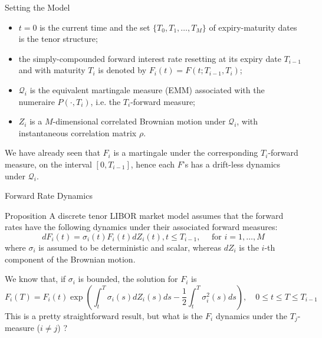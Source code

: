 \documentclass{beamer}
\begin{document}
\begin{frame}{Setting the Model}
  \begin{itemize}
  \item $t = 0$ is the current time and the set $\{T_0, T_1, \dots, T_M\}$ of expiry-maturity dates is the tenor structure; %
  \item the simply-compounded forward interest rate resetting at its expiry date $T_{i-1}$ and with maturity $T_i$ is denoted by $F_i(t) = F(t; T_{i-1}, T_i)$; %
  \item $\mathcal{Q}_i$ is the equivalent martingale measure (EMM) associated with the numeraire $P(\cdot, T_i)$, i.e. the $T_i$-forward measure;
  \item $Z_i$ is a $M$-dimensional correlated Brownian motion under $\mathcal{Q}_i$, with instantaneous correlation matrix $\rho$.
  \end{itemize}
  We have already seen that $F_i$ is a martingale under the corresponding $T_i$-forward measure, on the interval $[0, T_{i-1}]$, hence each $F$’s has a drift-less dynamics under $\mathcal{Q}_i$.
\end{frame}

\begin{frame}{Forward Rate Dynamics}
  \begin{block}{Proposition}
    A discrete tenor LIBOR market model assumes that the forward rates have the following dynamics under their associated forward measures:
    \begin{equation}
      dF_i(t) = \sigma_i(t)F_i(t)dZ_i(t), t \le T_{i-1},\quad\text{ for } i = 1,\ldots, M
      \label{eq:forward_process_lmm}
    \end{equation}
    where $\sigma_i$ is assumed to be deterministic and scalar, whereas $dZ_i$ is the $i$-th component of the Brownian motion.
  \end{block}
  We know that, if $\sigma_i$ is bounded, the solution for $F_i$ is 
  \begin{equation*}
    F_i(T) = F_i(t) \exp\left(\int_t^T\sigma_i(s)dZ_i(s)ds - \frac{1}{2}\int_t^T 
    \sigma_i^2(s)ds\right),\quad 0\le t \le T \le T_{i-1} 
  \end{equation*}
  This is a pretty straightforward result, but what is the $F_i$ dynamics under the $T_j$-measure ($i\neq j$) ?
\end{frame}
\end{document}
